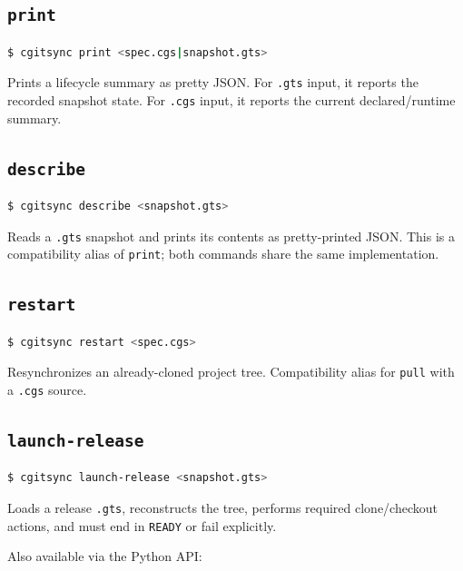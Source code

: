 \subsection{\texttt{print}}

\begin{lstlisting}[language=bash]
$ cgitsync print <spec.cgs|snapshot.gts>
\end{lstlisting}

Prints a lifecycle summary as pretty JSON. For \texttt{.gts} input, it reports
the recorded snapshot state. For \texttt{.cgs} input, it reports the current
declared/runtime summary.

\subsection{\texttt{describe}}

\begin{lstlisting}[language=bash]
$ cgitsync describe <snapshot.gts>
\end{lstlisting}

Reads a \texttt{.gts} snapshot and prints its contents as pretty-printed
JSON. This is a compatibility alias of \texttt{print}; both commands share the
same implementation.

\subsection{\texttt{restart}}

\begin{lstlisting}[language=bash]
$ cgitsync restart <spec.cgs>
\end{lstlisting}

Resynchronizes an already-cloned project tree. Compatibility alias for
\texttt{pull} with a \texttt{.cgs} source.

\subsection{\texttt{launch-release}}

\begin{lstlisting}[language=bash]
$ cgitsync launch-release <snapshot.gts>
\end{lstlisting}

Loads a release \texttt{.gts}, reconstructs the tree, performs required
clone/checkout actions, and must end in \texttt{READY} or fail explicitly.

Also available via the Python API:

